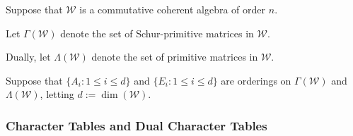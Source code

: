 \documentclass[notheorems]{beamer}
\theoremstyle{definition} %
\begin{document}
\begin{frame}



	Suppose that $\mathcal{W}$ is a commutative coherent algebra of order $n$.

	\vspace{1em}

	Let $\Gamma(\mathcal{W})$ denote the set of Schur-primitive matrices in $\mathcal{W}$.

	\vspace{1em}

	Dually, let $\Lambda(\mathcal{W})$ denote the set of primitive matrices in $\mathcal{W}$.

	\vspace{1em}

	Suppose that $\{ A_{i} : 1 \leq i \leq d \}$ and $\{ E_{i} : 1 \leq i \leq d \}$ are orderings 
	on $\Gamma(\mathcal{W})$ and $\Lambda(\mathcal{W})$, letting $d := \operatorname{dim}(\mathcal{W})$.

\end{frame}

\begin{frame}

\frametitle{Character Tables and Dual Character Tables}




\end{frame}
\end{document}
